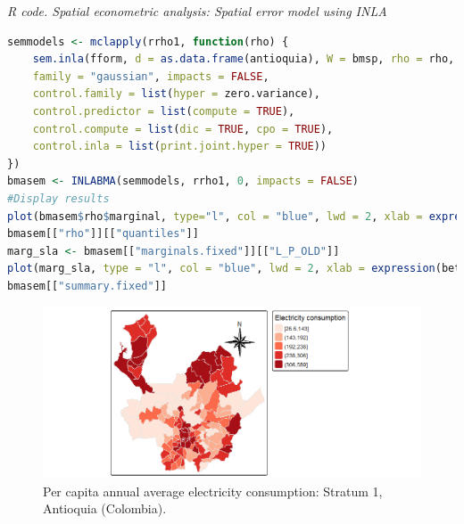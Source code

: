 \begin{tcolorbox}[enhanced,width=4.67in,center upper,
	fontupper=\large\bfseries,drop shadow southwest,sharp corners]
	\textit{R code. Spatial econometric analysis: Spatial error model using INLA}
	\begin{VF}
		\begin{lstlisting}[language=R]
semmodels <- mclapply(rrho1, function(rho) {
	sem.inla(fform, d = as.data.frame(antioquia), W = bmsp, rho = rho,
	family = "gaussian", impacts = FALSE,
	control.family = list(hyper = zero.variance),
	control.predictor = list(compute = TRUE),
	control.compute = list(dic = TRUE, cpo = TRUE),
	control.inla = list(print.joint.hyper = TRUE))
})
bmasem <- INLABMA(semmodels, rrho1, 0, impacts = FALSE)
#Display results
plot(bmasem$rho$marginal, type="l", col = "blue", lwd = 2, xlab = expression(lambda), ylab = "Density", main = "Spatial error model: Posterior spatial coefficient")
bmasem[["rho"]][["quantiles"]]
marg_sla <- bmasem[["marginals.fixed"]][["L_P_OLD"]]
plot(marg_sla, type = "l", col = "blue", lwd = 2, xlab = expression(beta[x]), ylab = "Density", main = "Spatial error model: Posterior price elasticity")
bmasem[["summary.fixed"]]
\end{lstlisting}
	\end{VF}
\end{tcolorbox}

\begin{figure}[!h]
	\centering
	\includegraphics[width=340pt]{Chapters/chapter15/figures/AntMap.png}
	\caption[List of figure caption goes here]{Per capita annual average electricity consumption: Stratum 1, Antioquia (Colombia).}
	\label{FigINLAmap1}
\end{figure}

